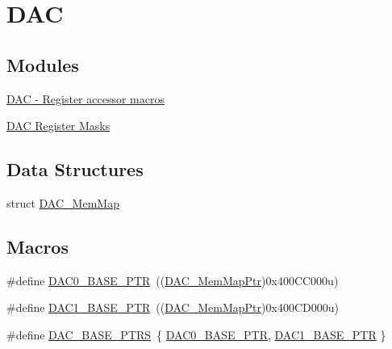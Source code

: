 \hypertarget{group___d_a_c___peripheral}{}\section{D\+A\+C}
\label{group___d_a_c___peripheral}
\subsection*{Modules}
\begin{DoxyCompactItemize}
\item 
\hyperlink{group___d_a_c___register___accessor___macros}{D\+A\+C -\/ Register accessor macros}
\item 
\hyperlink{group___d_a_c___register___masks}{D\+A\+C Register Masks}
\end{DoxyCompactItemize}
\subsection*{Data Structures}
\begin{DoxyCompactItemize}
\item 
struct \hyperlink{struct_d_a_c___mem_map}{D\+A\+C\+\_\+\+Mem\+Map}
\end{DoxyCompactItemize}
\subsection*{Macros}
\begin{DoxyCompactItemize}
\item 
\#define \hyperlink{group___d_a_c___peripheral_gabe3b30df06ec04e5c899efd6e49f1800}{D\+A\+C0\+\_\+\+B\+A\+S\+E\+\_\+\+P\+T\+R}~((\hyperlink{group___d_a_c___peripheral_gaf4fffbe25ce148c577ec740897223a7f}{D\+A\+C\+\_\+\+Mem\+Map\+Ptr})0x400\+C\+C000u)
\item 
\#define \hyperlink{group___d_a_c___peripheral_gab3af24d21edf756c3f794c52b5789847}{D\+A\+C1\+\_\+\+B\+A\+S\+E\+\_\+\+P\+T\+R}~((\hyperlink{group___d_a_c___peripheral_gaf4fffbe25ce148c577ec740897223a7f}{D\+A\+C\+\_\+\+Mem\+Map\+Ptr})0x400\+C\+D000u)
\item 
\#define \hyperlink{group___d_a_c___peripheral_gab47690040e4d63adc4f324358c27157a}{D\+A\+C\+\_\+\+B\+A\+S\+E\+\_\+\+P\+T\+R\+S}~\{ \hyperlink{group___d_a_c___peripheral_gabe3b30df06ec04e5c899efd6e49f1800}{D\+A\+C0\+\_\+\+B\+A\+S\+E\+\_\+\+P\+T\+R}, \hyperlink{group___d_a_c___peripheral_gab3af24d21edf756c3f794c52b5789847}{D\+A\+C1\+\_\+\+B\+A\+S\+E\+\_\+\+P\+T\+R} \}
\end{DoxyCompactItemize}
